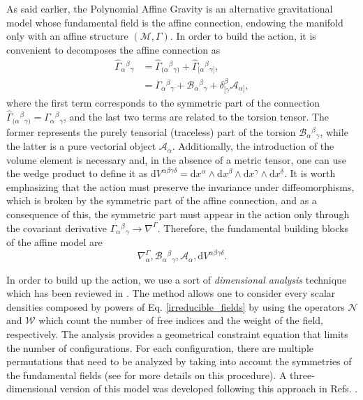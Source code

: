 \documentclass[epj]{svjour}
\providecommand{\ctG}[3]{\Gamma_{#1}{}^{#2}{}_{#3}}
\providecommand{\B}[3]{\mathcal{B}_{#1}{}^{#2}{}_{#3}}
\providecommand{\A}[1]{\mathcal{A}_{#1}}
\providecommand{\deV}[1]{\mathrm{d}V^{#1}}
\begin{document}
As said earlier, the Polynomial Affine Gravity is an alternative gravitational model whose fundamental field is  the affine connection, endowing the manifold only with an affine structure $(\mathcal{M},\Gamma)$. In order to build the action, it is convenient to decomposes the affine connection as
\begin{equation}
\begin{aligned}
    \label{affine_connection}
    \hat{\Gamma}_{\alpha}{}^{\beta}{}_{\gamma} & = \hat{\Gamma}_{(\alpha}{}^{\beta}{}_{\gamma)} +  \hat{\Gamma}_{[\alpha}{}^{\beta}{}_{\gamma]},  \\
    & = \ctG{\alpha}{\beta}{\gamma} + \B{\alpha}{\beta}{\gamma} + \delta^{\beta}_{[\gamma}\A{\alpha]},
\end{aligned}
\end{equation}
where the first term corresponds to the symmetric part of the connection $\hat{\Gamma}_{(\alpha}{}^{\beta}{}_{\gamma)} = \ctG{\alpha}{\beta}{\gamma}$, and
the last two terms are related to the torsion tensor. The former represents  the purely tensorial (traceless) part of the torsion $\B{\alpha}{\beta}{\gamma}$, while the latter is a pure vectorial object $\A{\alpha}$.
Additionally,  the introduction of the volume element is necessary and, in the absence of a metric tensor, one can use the wedge product to define it as  $\deV{\alpha\beta\gamma\delta} = \mathrm{d}x^{\alpha}\wedge\mathrm{d}x^{\beta}\wedge
\mathrm{d}x^{\gamma}\wedge\mathrm{d}x^{\delta}$. It is worth emphasizing that the action must preserve the invariance under diffeomorphisms, which is broken by the symmetric part of the affine connection, and as a consequence of this,
the symmetric part must appear in the action only through the covariant derivative $\ctG{\alpha}{\beta}{\gamma} \to \nabla^\Gamma$.
Therefore, the fundamental building blocks of the affine model are 
\begin{equation}
\label{irreducible_fields}
\nabla^\Gamma_\alpha, \B{\alpha}{\beta}{\gamma}, \mathcal{A}_\alpha, \mathrm{d}V^{\alpha\beta\gamma\delta}.
\end{equation}

In order to build up the action, we use a sort of \textit{dimensional analysis} technique which has been reviewed in \cite{castillofelisola2016einsteins,Castillo_Felisola_2020}.
The method allows one to consider every scalar densities composed by powers of Eq. \eqref{irreducible_fields} by using the operators $\mathcal{N}$ and $\mathcal{W}$ which count the number of free indices and the weight of the field, respectively. The analysis provides a geometrical constraint equation that limits the number of configurations. For each configuration, there are multiple permutations that need to be analyzed by taking into account the symmetries of the fundamental fields (see \cite{castillofelisola2016einsteins,Castillo_Felisola_2020}  for more details on this procedure). 
A three-dimensional version of this model was developed following this approach in Refs. \cite{Castillo_Felisola_2022_EPJC,Castillo_Felisola_2022_Universe}.
\end{document}
